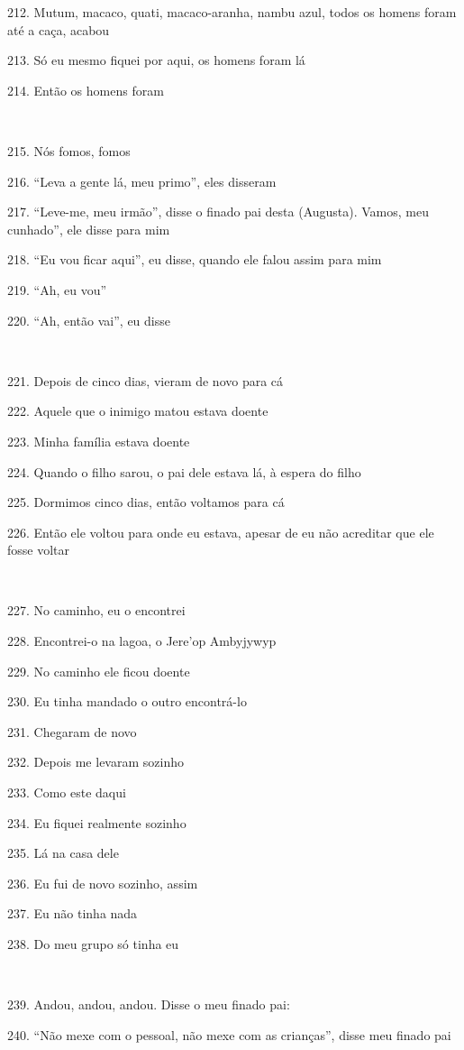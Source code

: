 212. Mutum, macaco, quati, macaco-aranha, nambu azul, todos os homens
foram até a caça, acabou

213. Só eu mesmo fiquei por aqui, os homens foram lá

214. Então os homens foram

~

215. Nós fomos, fomos

216. ``Leva a gente lá, meu primo'', eles disseram

217. ``Leve-me, meu irmão'', disse o finado pai desta (Augusta).  Vamos,
meu cunhado'', ele disse para mim

218. ``Eu vou ficar aqui'', eu disse, quando ele falou assim para mim

219. ``Ah, eu vou''

220. ``Ah, então vai'', eu disse

~

221. Depois de cinco dias, vieram de novo para cá

222. Aquele que o inimigo matou estava doente

223. Minha família estava doente

224. Quando o filho sarou, o pai dele estava lá, à espera do filho

225. Dormimos cinco dias, então voltamos para cá

226. Então ele voltou para onde eu estava, apesar de eu não acreditar que
ele fosse voltar

~

227. No caminho, eu o encontrei

228. Encontrei-o na lagoa, o Jere'op Ambyjywyp

229. No caminho ele ficou doente

230. Eu tinha mandado o outro encontrá-lo

231. Chegaram de novo

232. Depois me levaram sozinho

233. Como este daqui

234. Eu fiquei realmente sozinho

235. Lá na casa dele

236. Eu fui de novo sozinho, assim

237. Eu não tinha nada

238. Do meu grupo só tinha eu

~

239. Andou, andou, andou. Disse o meu finado pai:

240. ``Não mexe com o pessoal, não mexe com as crianças'', disse meu finado pai

